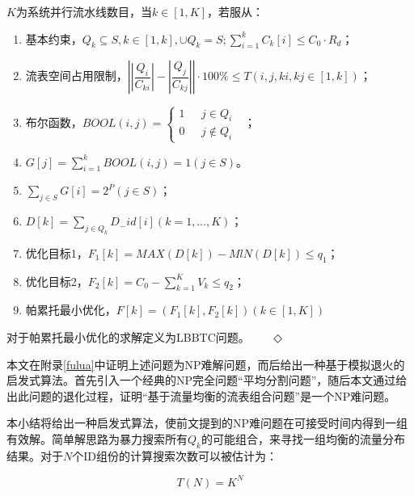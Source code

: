 \begin{definition}[LBBTC]
	$K$为系统并行流水线数目，当$k\in [1,K]$，若服从：
	\begin{enumerate}
		\item 基本约束，$Q_{k}\subseteq S, k\in \left[ 1,k\right],\cup Q_{k}=S;\sum ^{k}_{i=1}C_{k}\left[ i\right] \leq C_{0}\cdot R_{d} $；
		\item 流表空间占用限制，$\left| \left| \dfrac {Q_{i}}{C_{ki}}\right| -\left| \dfrac {Q_{j}}{C_{kj}}\right| \right|\cdot 100\%\leq T\left( i, j, ki, kj\in \left[ 1,k\right] \right) $；
		\item 布尔函数，$ BOOL\left(i,j\right)=
		\begin{cases}
		1& \text{ $j \in Q_i$ }\\
		0& \text{ $j \notin Q_i$}
		\end{cases}$；
		\item $G\left[ j\right] =\sum ^{k}_{i=1}BOOL\left( i,j\right) =1\left( j\in S\right)  $。
		\item $\sum _{j\in S}G\left[ i\right] =2^{P}\left( j\in S\right)  $；
		\item $D\left[ k\right] =\sum _{j\in Q_{k}}D_{-}id\left[ i\right] \left( k=1,\ldots ,K\right)  $；
		\item 优化目标1，$ F_{1}\left[ k\right] =MAX\left( D\left[ k\right] \right) -MlN\left( D\left[ k\right] \right) \leq q_1$；
		\item 优化目标2，$ F_{2}\left[ k\right] =C_{0}-\sum ^{K}_{k=1}V_{k}\leq q_{2}$；
		\item 帕累托最小优化，$ F\left[ k\right] =\left( F_{1}\left[ k\right] ,F_{2}\left[ k\right] \right) \left( k\in \left[ 1,K\right] \right)  $
	\end{enumerate}
	对于帕累托最小优化的求解定义为LBBTC问题。 \qquad \qquad \qquad \qquad \qquad \qquad \qquad \ \ \  $\Diamond$
\end{definition}


本文在附录\ref{fulua}中证明上述问题为NP难解问题，而后给出一种基于模拟退火的启发式算法。首先引入一个经典的NP完全问题“平均分割问题”，随后本文通过给出此问题的退化过程，证明“基于流量均衡的流表组合问题”是一个NP难问题。



本小结将给出一种启发式算法，使前文提到的NP难问题在可接受时间内得到一组有效解。简单解思路为暴力搜索所有$Q_k$的可能组合，来寻找一组均衡的流量分布结果。对于$N$个ID组份的计算搜索次数可以被估计为：

\begin{equation}
	T(N)=K^N
\end{equation}

